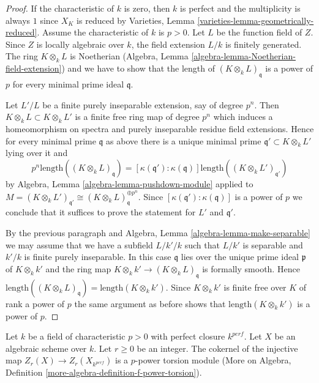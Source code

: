 \begin{proof}
If the characteristic of $k$ is zero, then $k$ is perfect and
the multiplicity is always $1$ since $X_K$ is reduced by
Varieties, Lemma \ref{varieties-lemma-geometrically-reduced}.
Assume the characteristic of $k$ is $p > 0$.
Let $L$ be the function field of $Z$. Since $Z$ is locally algebraic
over $k$, the field extension $L/k$ is finitely generated.
The ring $K \otimes_k L$ is Noetherian
(Algebra, Lemma \ref{algebra-lemma-Noetherian-field-extension}) and we
have to show that the length of $(K \otimes_k L)_\mathfrak q$
is a power of $p$ for every minimal prime ideal $\mathfrak q$.

\medskip\noindent
Let $L'/L$ be a finite purely inseparable extension, say of degree
$p^n$. Then $K \otimes_k L \subset K \otimes_k L'$ is a finite
free ring map of degree $p^n$ which induces a homeomorphism on
spectra and purely inseparable residue field extensions.
Hence for every minimal prime $\mathfrak q$ as above
there is a unique minimal prime
$\mathfrak q' \subset K \otimes_k L'$ lying over it and
$$
p^n \text{length}((K \otimes_k L)_\mathfrak q) =
[\kappa(\mathfrak q') : \kappa(\mathfrak q)]
\text{length}((K \otimes_k L')_{\mathfrak q'})
$$
by Algebra, Lemma \ref{algebra-lemma-pushdown-module} applied
to $M = (K \otimes_k L')_{\mathfrak q'} \cong
(K \otimes_k L)_{\mathfrak q}^{\oplus p^n}$.
Since $[\kappa(\mathfrak q') : \kappa(\mathfrak q)]$ is a power
of $p$ we conclude that it suffices to prove the
statement for $L'$ and $\mathfrak q'$.

\medskip\noindent
By the previous paragraph and Algebra, Lemma \ref{algebra-lemma-make-separable}
we may assume that we have a subfield $L/k'/k$
such that $L/k'$ is separable and $k'/k$ is finite
purely inseparable. In this case $\mathfrak q$ lies
over the unique prime ideal $\mathfrak p$ of $K \otimes_k k'$
and the ring map $K \otimes_k k' \to (K \otimes_k L)_\mathfrak q$
is formally smooth. Hence
$\text{length}((K \otimes_k L)_\mathfrak q) =
\text{length}(K \otimes_k k')$.
Since $K \otimes_k k'$ is finite free over $K$ of
rank a power of $p$ the same argument as before shows
that $\text{length}(K \otimes_k k')$ is a power of $p$.
\end{proof}

\begin{lemma}
\label{lemma-how-different}
Let $k$ be a field of characteristic $p > 0$ with perfect closure $k^{perf}$.
Let $X$ be an algebraic scheme over $k$. Let $r \geq 0$ be an integer.
The cokernel of the injective map $Z_r(X) \to Z_r(X_{k^{perf}})$ is a
$p$-power torsion module (More on Algebra, Definition
\ref{more-algebra-definition-f-power-torsion}).
\end{lemma}

